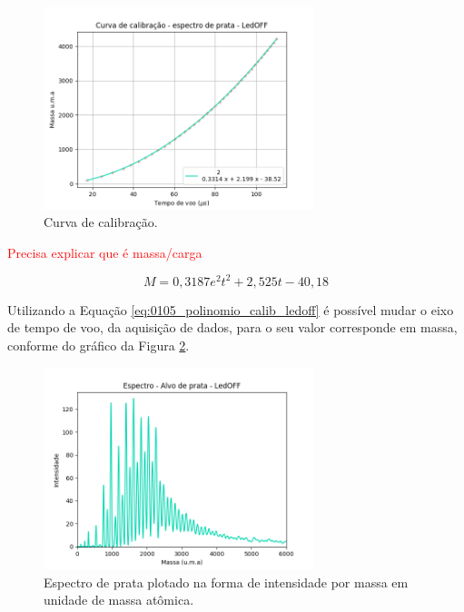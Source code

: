 \begin{figure}
  \centering  
  \includegraphics[width=0.7\textwidth]{graficos_resultados/0105_LEDOFF_curv_calib.png}
  \caption{Curva de calibração.}
  \label{fig:1105_curva_calib_ledoff} 
\end{figure}


\textcolor{red}{Precisa explicar que é massa/carga}




\begin{equation}
\label{eq:0105_polinomio_calib_ledoff}
M = 0,3187e^{2} t^2 + 2,525 t - 40,18
\end{equation}

Utilizando a Equação \ref{eq:0105_polinomio_calib_ledoff} é possível mudar o eixo de tempo de voo, da aquisição de dados, para o seu valor corresponde em massa, conforme do gráfico da Figura \ref{fig:0105_LEDOFF_espec_calib_ag_massa}.

\begin{figure}
  \centering  
  \includegraphics[width=0.7\textwidth]{graficos_resultados/0105_LEDOFF_espec_calib_ag_massa}
  \caption{Espectro de prata plotado na forma de intensidade por massa em unidade de massa atômica.}
  \label{fig:0105_LEDOFF_espec_calib_ag_massa} 
\end{figure}




